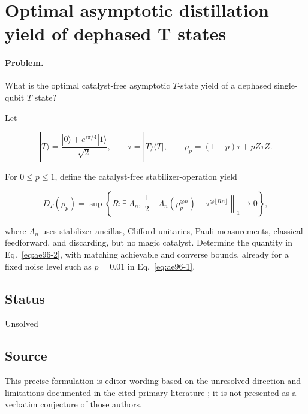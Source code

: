 \section{Optimal asymptotic distillation yield of dephased T states}
\label{sec:op_ae968c5086f34fea}

\paragraph{Problem.}
What is the optimal catalyst-free asymptotic $T$-state yield of a dephased single-qubit $T$ state?

Let

\begin{equation}
|T\rangle=\frac{|0\rangle+e^{i\pi/4}|1\rangle}{\sqrt2},
\qquad
\tau=|T\rangle\langle T|,
\qquad
\rho_p=(1-p)\tau+pZ\tau Z.
\label{eq:ae96-1}
\end{equation}

For $0\leq p\leq1$, define the catalyst-free stabilizer-operation yield

\begin{equation}
D_T(\rho_p)=\sup\left\{R:
\exists\ \Lambda_n,\
\frac12\left\|\Lambda_n(\rho_p^{\otimes n})
-\tau^{\otimes\lfloor Rn\rfloor}\right\|_1\longrightarrow0\right\},
\label{eq:ae96-2}
\end{equation}

where $\Lambda_n$ uses stabilizer ancillas, Clifford unitaries, Pauli measurements, classical feedforward, and discarding, but no magic catalyst. Determine the quantity in Eq.~\eqref{eq:ae96-2}, with matching achievable and converse bounds, already for a fixed noise level such as $p=0.01$ in Eq.~\eqref{eq:ae96-1}.

\subsection*{Status}

Unsolved

\subsection*{Source}

This precise formulation is editor wording based on the unresolved direction and limitations documented in the cited primary literature ; it is not presented as a verbatim conjecture of those authors.

